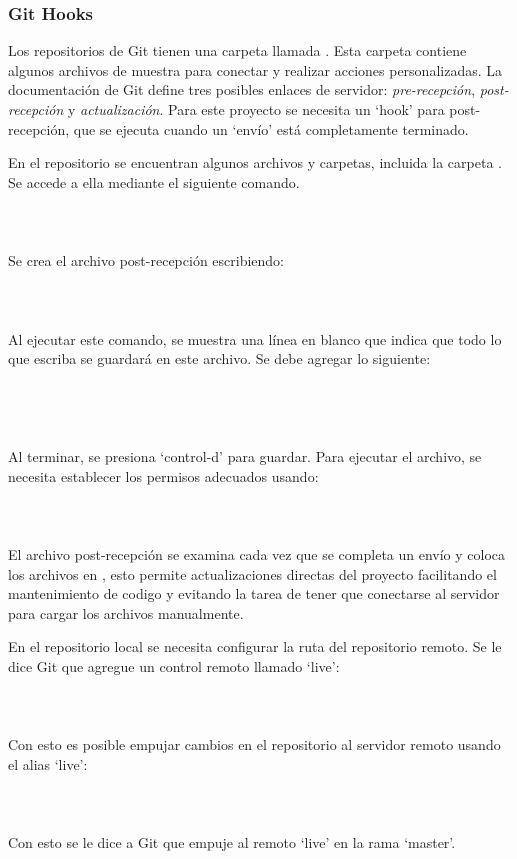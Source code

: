 \subsubsection{Git Hooks}
Los repositorios de Git tienen una carpeta llamada . Esta carpeta contiene algunos archivos de muestra para conectar y realizar acciones personalizadas. La documentación de Git define tres posibles enlaces de servidor: \textit{pre-recepción}, \textit{post-recepción} y \textit{actualización}. Para este proyecto se necesita un `hook' para post-recepción, que se ejecuta cuando un `envío' está completamente terminado.
\vspace{0.8cm}

En el repositorio se encuentran algunos archivos y carpetas, incluida la carpeta . Se accede a ella mediante el siguiente comando.\\
\\
\\
\\
Se crea el archivo post-recepción escribiendo:\\
\\
\\
\\
Al ejecutar este comando, se muestra una línea en blanco que indica que todo lo que escriba se guardará en este archivo. Se debe agregar lo siguiente:\\
\\
\\
\\
\\
Al terminar, se presiona `control-d' para guardar. Para ejecutar el archivo, se necesita establecer los permisos adecuados usando:\\
\\
\\
\\
El archivo post-recepción se examina cada vez que se completa un envío y coloca los archivos en , esto permite actualizaciones directas del proyecto facilitando el mantenimiento de codigo y evitando la tarea de tener que conectarse al servidor para cargar los archivos manualmente.
\vspace{0.8cm}

En el repositorio local se necesita configurar la ruta del repositorio remoto. Se le dice Git que agregue un control remoto llamado `live':\\
\\
\\
\\
Con esto es posible empujar cambios en el repositorio al servidor remoto usando el alias `live':\\
\\
\\
\\
Con esto se le dice a Git que empuje al remoto `live' en la rama `master'.
\vspace{0.8cm}

